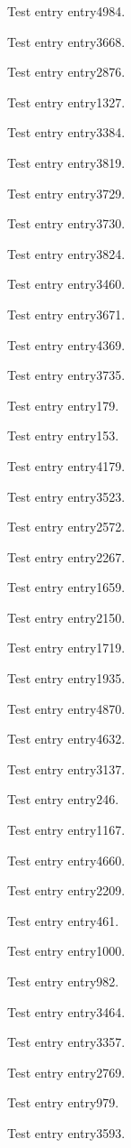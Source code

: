 Test entry \gls{entry4984}.

Test entry \gls{entry3668}.

Test entry \gls{entry2876}.

Test entry \gls{entry1327}.

Test entry \gls{entry3384}.

Test entry \gls{entry3819}.

Test entry \gls{entry3729}.

Test entry \gls{entry3730}.

Test entry \gls{entry3824}.

Test entry \gls{entry3460}.

Test entry \gls{entry3671}.

Test entry \gls{entry4369}.

Test entry \gls{entry3735}.

Test entry \gls{entry179}.

Test entry \gls{entry153}.

Test entry \gls{entry4179}.

Test entry \gls{entry3523}.

Test entry \gls{entry2572}.

Test entry \gls{entry2267}.

Test entry \gls{entry1659}.

Test entry \gls{entry2150}.

Test entry \gls{entry1719}.

Test entry \gls{entry1935}.

Test entry \gls{entry4870}.

Test entry \gls{entry4632}.

Test entry \gls{entry3137}.

Test entry \gls{entry246}.

Test entry \gls{entry1167}.

Test entry \gls{entry4660}.

Test entry \gls{entry2209}.

Test entry \gls{entry461}.

Test entry \gls{entry1000}.

Test entry \gls{entry982}.

Test entry \gls{entry3464}.

Test entry \gls{entry3357}.

Test entry \gls{entry2769}.

Test entry \gls{entry979}.

Test entry \gls{entry3593}.

